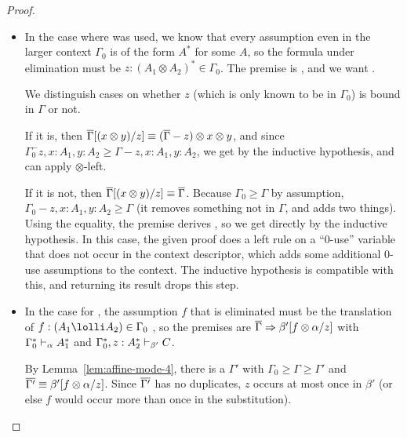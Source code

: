 \begin{proof}
\begin{itemize}
\item In the case where \FL\/ was used, we know that every assumption
  even in the larger context $\Gamma_0$ is of the form $A^*$ for some
  $A$, so the formula under elimination must be $z:(A_1 \otimes A_2)^*
  \in \Gamma_0$. The premise is
  , and we want .

  We distinguish cases on whether $z$ (which is only known to be in
  $\Gamma_0$) is bound in $\Gamma$ or not.  

  If it is, then $\overline{\Gamma}[(x \otimes y)/z] \equiv
  (\overline{\Gamma}-z)\otimes x \otimes y$, and since
  $\Gamma_0^-z,x:A_1,y:A_2 \ge \Gamma-z,x:A_1,y:A_2$, we get
   by the inductive hypothesis, and can
  apply $\otimes$-left.

  If it is not, then $\overline{\Gamma}[(x \otimes y)/z] \equiv
  \overline{\Gamma}$.  Because $\Gamma_0 \ge \Gamma$ by assumption,
  ${\Gamma_0-z,x:A_1,y:A_2} \ge \Gamma$ (it removes something not in
  $\Gamma$, and adds two things).  Using the equality, the premise derives
  ,
  so we get  directly by the inductive hypothesis.  
  In this case, the given proof does a left rule on a ``0-use''
  variable that does not occur in the context descriptor, which adds
  some additional 0-use assumptions to the context.  The inductive
  hypothesis is compatible with this, and returning its result
  drops this step.    

\item In the case for \UL, the assumption $f$ that is eliminated must be
  the translation of $f:(A_1 \lolli A_2) \in \Gamma_0$ , so the premises
  are $\overline{\Gamma} \Rightarrow \beta'[f \otimes \alpha/z]$ with
  $\Gamma_0^* \vdash_{\alpha} A_1^*$ and
  $\Gamma_0^*,z:A_2^* \vdash_{\beta'} C$.

  By Lemma~\ref{lem:affine-mode-4}, there is a $\Gamma'$ with $\Gamma_0
  \ge \Gamma \ge \Gamma'$ and $\overline{\Gamma'} \equiv \beta'[f \otimes
    \alpha/z]$.  Since $\overline{\Gamma'}$ has no duplicates, $z$ occurs at
  most once in $\beta'$ (or else $f$ would occur more than once in the
  substitution).
  


\end{itemize}
\end{proof}
